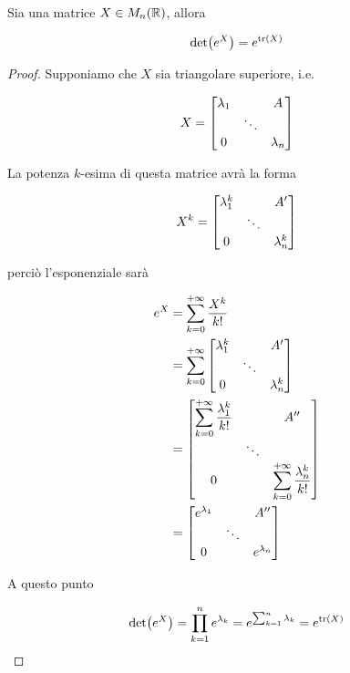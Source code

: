 \begin{definition}
	Sia una matrice $ X \in M_{n}(\mathbb{R}) $, allora
	
	\begin{equation}
		\det(e^{X}) = e^{\tr(X)}
	\end{equation}
\end{definition}

\begin{proof}
	Supponiamo che $ X $ sia triangolare superiore, i.e.
	
	\begin{equation}
		X = %
		\bmqty{ %
				\lambda_{1} & & A \\
				& \ddots & \\
				0 & & \lambda_{n} %
				}
	\end{equation}

	La potenza $ k $-esima di questa matrice avrà la forma
	
	\begin{equation}
		X^{k} = %
		\bmqty{ %
				\lambda_{1}^{k} & & A' \\
				& \ddots & \\
				0 & & \lambda_{n}^{k} %
				}
	\end{equation}

	perciò l'esponenziale sarà
	
	\begin{align}
		\begin{split}
			e^{X} &= \sum_{k=0}^{+\infty} \dfrac{X^{k}}{k!} \\
			&= \sum_{k=0}^{+\infty} %
				\bmqty{ %
						\lambda_{1}^{k} & & A' \\
						& \ddots & \\
						0 & & \lambda_{n}^{k} %
						} \\
			&= \bmqty{ %
						\displaystyle\sum_{k=0}^{+\infty} \dfrac{\lambda_{1}^{k}}{k!} & & A'' \\
						& \ddots & \\
						0 & & \displaystyle\sum_{k=0}^{+\infty} \dfrac{\lambda_{n}^{k}}{k!} %
						} \\
			&= \bmqty{ %
						e^{\lambda_{1}} & & A'' \\
						& \ddots & \\
						0 & & e^{\lambda_{n}} %
						}
		\end{split}
	\end{align}

	A questo punto
	
	\begin{equation}
		\det(e^{X}) = \prod_{k=1}^{n} e^{\lambda_{k}} %
		= e^{\sum_{k=1}^{n} \lambda_{k}} %
		= e^{\tr(X)}
	\end{equation}


\end{proof}
